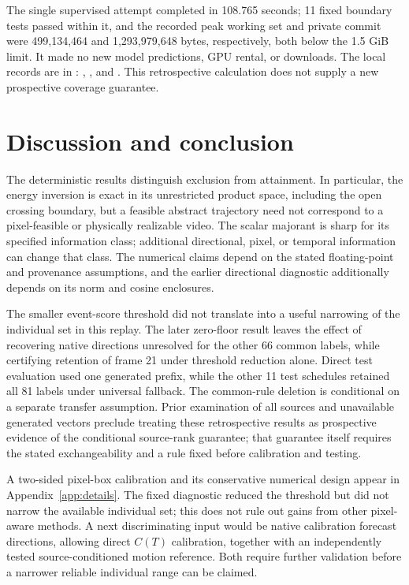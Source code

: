\documentclass[11pt]{article}
\theoremstyle{noteplain}
\begin{document}
The single supervised attempt completed in 108.765 seconds; 11 fixed boundary tests passed within it, and the recorded peak working set and private commit were 499,134,464 and 1,293,979,648 bytes, respectively, both below the 1.5 GiB limit. It made no new model predictions, GPU rental, or downloads. The local records are in \allowbreak{}\allowbreak{}: , , and . This retrospective calculation does not supply a new prospective coverage guarantee.

\section{Discussion and conclusion}\label{sec:discussion}
The deterministic results distinguish exclusion from attainment. In particular, the energy inversion is exact in its unrestricted product space, including the open crossing boundary, but a feasible abstract trajectory need not correspond to a pixel-feasible or physically realizable video. The scalar majorant is sharp for its specified information class; additional directional, pixel, or temporal information can change that class. The numerical claims depend on the stated floating-point and provenance assumptions, and the earlier directional diagnostic additionally depends on its norm and cosine enclosures.

The smaller event-score threshold did not translate into a useful narrowing of the individual set in this replay. The later zero-floor result leaves the effect of recovering native directions unresolved for the other 66 common labels, while certifying retention of frame 21 under threshold reduction alone. Direct test evaluation used one generated prefix, while the other 11 test schedules retained all 81 labels under universal fallback. The common-rule deletion is conditional on a separate transfer assumption. Prior examination of all sources and unavailable generated vectors preclude treating these retrospective results as prospective evidence of the conditional source-rank guarantee; that guarantee itself requires the stated exchangeability and a rule fixed before calibration and testing.

A two-sided pixel-box calibration and its conservative numerical design appear in Appendix~\ref{app:details}. The fixed diagnostic reduced the threshold but did not narrow the available individual set; this does not rule out gains from other pixel-aware methods. A next discriminating input would be native calibration forecast directions, allowing direct $C(T)$ calibration, together with an independently tested source-conditioned motion reference. Both require further validation before a narrower reliable individual range can be claimed.
\end{document}
